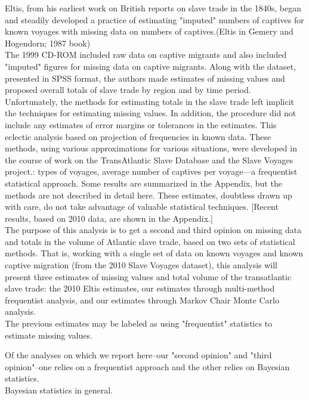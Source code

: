 \documentclass[preprint,12pt]{elsarticle}
\begin{document}
Eltis, from his earliest work on British reports on slave trade in the 1840s, began and steadily developed a practice of estimating "imputed" numbers of captives for known voyages with missing data on numbers of captives.(Eltis in Gemery and Hogendorn; 1987 book)\\

The 1999 CD-ROM included raw data on captive migrants and also included "imputed" figures for missing data on captive migrants. Along with the dataset, presented in SPSS format, the authors made estimates of missing values and proposed overall totals of slave trade by region and by time period. Unfortunately, the methods for estimating totals in the slave trade left implicit the techniques for estimating missing values. In addition, the procedure did not include any estimates of error margins or tolerances in the estimates. This eclectic analysis based on projection of frequencies in known data. These methods, using various approximations for various situations, were developed in the course of work on the TransAtlantic Slave Database and the Slave Voyages project.: types of voyages, average number of captives per voyage—a frequentist statistical approach.  Some results are summarized in the Appendix, but the methods are not described in detail here. These estimates, doubtless drawn up with care, do not take advantage of valuable statistical techniques. [Recent results, based on 2010 data, are shown in the Appendix.]\\

The purpose of this analysis is to get a second and third opinion on missing data and totals in the volume of Atlantic slave trade, based on two sets of statistical methods. That is, working with a single set of data on known voyages and known captive migration (from the 2010 Slave Voyages dataset), this analysis will present three estimates of missing values and total volume of the transatlantic slave trade: the 2010 Eltis estimates, our estimates through multi-method frequentist analysis, and our estimates through Markov Chair Monte Carlo analysis.\\

The previous estimates may be labeled as using "frequentist" statistics to estimate missing values.

Of the analyses on which we report here--our "second opinion" and "third opinion"--one relies on a frequentist approach and the other relies on Bayesian statistics.\\


Bayesian statistics in general.
\end{document}
